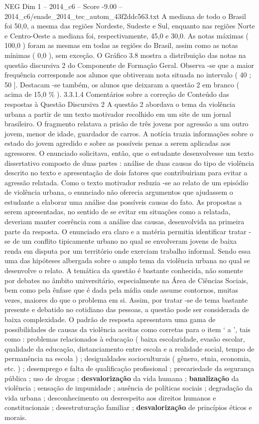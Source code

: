\begin{textsample}{NEG Dim 1 – 2014\_c6 – Score -9.00 – 2014\_c6/enade\_2014\_tec\_autom\_43f2ddc563.txt}
A mediana de todo o Brasil foi 50,0, a mesma das regiões Nordeste, Sudeste e Sul, enquanto nas regiões Norte e Centro-Oeste a mediana foi, respectivamente, 45,0 e 30,0.
As notas máximas ( 100,0 ) foram as mesmas em todas as regiões do Brasil, assim como as notas mínimas ( 0,0 ), sem exceção.
O Gráfico 3.8 mostra a distribuição das notas na questão discursiva 2 do Componente de Formação Geral.
Observa -se que a maior frequência corresponde aos alunos que obtiveram nota situada no intervalo ( 40 ; 50 ].
Destacam -se também, os alunos que deixaram a questão 2 em branco ( acima de 15,0 \% ). 3.3.1.4 Comentários sobre a correção de Conteúdo das respostas à Questão Discursiva 2 A questão 2 abordava o tema da violência urbana a partir de um texto motivador recolhido em um site de um jornal brasileiro.
O fragmento relatava a prisão de três jovens por agressão a um outro jovem, menor de idade, guardador de carros.
A notícia trazia informações sobre o estado do jovem agredido e sobre as possíveis penas a serem aplicadas aos agressores.
O enunciado solicitava, então, que o estudante desenvolvesse um texto dissertativo composto de duas partes : análise de duas causas do tipo de violência descrito no texto e apresentação de dois fatores que contribuiriam para evitar a agressão relatada.
Como o texto motivador reduzia -se ao relato de um episódio de violência urbana, o enunciado não oferecia argumentos que ajudassem o estudante a elaborar uma análise das possíveis causas do fato.
As propostas a serem apresentadas, no sentido de se evitar em situações como a relatada, deveriam manter coerência com a análise das causas, desenvolvida na primeira parte da resposta.
O enunciado era claro e a matéria permitia identificar tratar -se de um conflito tipicamente urbano no qual se envolveram jovens de baixa renda em disputa por um território onde exerciam trabalho informal.
Sendo essa uma das hipóteses albergada sobre o amplo tema da violência urbana no qual se desenvolve o relato.
A temática da questão é bastante conhecida, não somente por debates no âmbito universitário, especialmente na Área de Ciências Sociais, bem como pela ênfase que é dada pela mídia onde assume contornos, muitas vezes, maiores do que o problema em si.
Assim, por tratar -se de tema bastante presente e debatido no cotidiano das pessoas, a questão pode ser considerada de baixa complexidade.
O padrão de resposta apresentava uma gama de possibilidades de causas da violência aceitas como corretas para o item ‘ a ’, tais como : problemas relacionados à educação ( baixa escolaridade, evasão escolar, qualidade da educação, distanciamento entre escola e a realidade social, tempo de permanência na escola ) ; desigualdades socioculturais ( gênero, etnia, economia, etc. ) ; desemprego e falta de qualificação profissional ; precariedade da segurança pública ; uso de drogas ; \textbf{desvalorização} da vida humana ; \textbf{banalização} da violência ; sensação de impunidade ; ausência de políticas sociais ; degradação da vida urbana ; desconhecimento ou desrespeito aos direitos humanos e constitucionais ; desestruturação familiar ; \textbf{desvalorização} de princípios éticos e morais.

\end{textsample}
